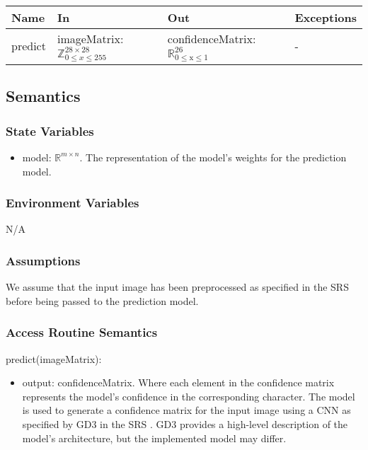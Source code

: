 \documentclass[12pt, titlepage]{article}
\begin{document}
\begin{itemize}
\begin{center}
\begin{tabular}{p{2cm} p{4cm} p{4cm} p{2cm}}
\hline
\textbf{Name} & \textbf{In} & \textbf{Out} & \textbf{Exceptions} \\
\hline
predict & imageMatrix: $\mathbb{Z}^{28 \times 28}_{0 \le x \le 255}$ & confidenceMatrix: $\mathbb{R}_{\text{0} \leq \text{x} \leq \text{1}}^{26}$ & - \\
\hline
\end{tabular}
\end{center}

\subsection{Semantics}

\subsubsection{State Variables}

\begin{itemize}
  \item model: $\mathbb{R}^{m \times n}$. The representation of the model's
  weights for the prediction model.
\end{itemize}

\subsubsection{Environment Variables}

N/A

\subsubsection{Assumptions}

We assume that the input image has been preprocessed as specified in the SRS
before being passed to the prediction model.


\subsubsection{Access Routine Semantics}

\noindent predict(imageMatrix):
\begin{itemize}
\item output: confidenceMatrix. Where each element in the confidence matrix
represents the model's confidence in the corresponding character. The model is
used to generate a confidence matrix for the input image using a CNN as
specified by GD3 in the SRS \cite[4.2.3]{SRS}. GD3 provides a high-level
description of the model's architecture, but the implemented model may differ.
\end{itemize}



\end{itemize}
\end{document}
